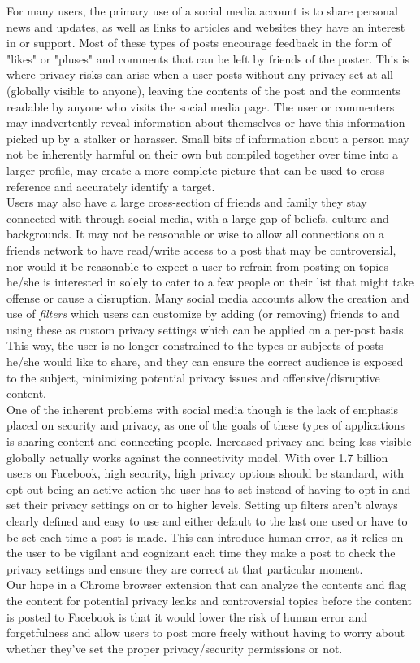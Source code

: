 \tab For many users, the primary use of a social media account is to share personal news and updates, as well as links to articles and websites they have an interest in or support. Most of these types of posts encourage feedback in the form of "likes" or "pluses" and comments that can be left by friends of the poster. This is where privacy risks can arise when a user posts without any privacy set at all (globally visible to anyone), leaving the contents of the post and the comments readable by anyone who visits the social media page. The user or commenters may inadvertently reveal information about themselves or have this information picked up by a stalker or harasser. Small bits of information about a person may not be inherently harmful on their own but compiled together over time into a larger profile, may create a more complete picture that can be used to cross-reference and accurately identify a target.\cite{ghazinour2016yourprivacyprotector} 
\\
\tab Users may also have a large cross-section of friends and family they stay connected with through social media, with a large gap of beliefs, culture and backgrounds. It may not be reasonable or wise to allow all connections on a friends network to have read/write access to a post that may be controversial, nor would it be reasonable to expect a user to refrain from posting on topics he/she is interested in solely to cater to a few people on their list that might take offense or cause a disruption. Many social media accounts allow the creation and use of {\it filters} which users can customize by adding (or removing) friends to and using these as custom privacy settings which can be applied on a per-post basis. This way, the user is no longer constrained to the types or subjects of posts he/she would like to share, and they can ensure the correct audience is exposed to the subject, minimizing potential privacy issues and offensive/disruptive content.
\\
\tab One of the inherent problems with social media though is the lack of emphasis placed on security and privacy, as one of the goals of these types of applications is sharing content and connecting people. Increased privacy and being less visible globally actually works against the connectivity model. With over 1.7 billion users on Facebook\cite{statista}, high security, high privacy options should be standard, with opt-out being an active action the user has to set instead of having to opt-in and set their privacy settings on or to higher levels. Setting up filters aren't always clearly defined and easy to use and either default to the last one used or have to be set each time a post is made. This can introduce human error, as it relies on the user to be vigilant and cognizant each time they make a post to check the privacy settings and ensure they are correct at that particular moment. 
\\
\tab Our hope in a Chrome browser extension that can analyze the contents and flag the content for potential privacy leaks and controversial topics before the content is posted to Facebook is that it would lower the risk of human error and forgetfulness and allow users to post more freely without having to worry about whether they've set the proper privacy/security permissions or not. 
